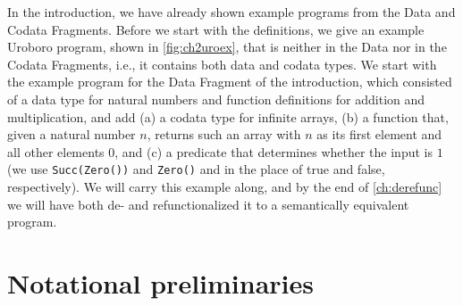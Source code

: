 In the introduction, we have already shown example programs from the Data and Codata Fragments. Before we start with the definitions, we give an example Uroboro program, shown in \autoref{fig:ch2uroex}, that is neither in the Data nor in the Codata Fragments, i.e., it contains both data and codata types. We start with the example program for the Data Fragment of the introduction, which consisted of a data type for natural numbers and function definitions for addition and multiplication, and add (a) a codata type for infinite arrays, (b) a function that, given a natural number $n$, returns such an array with $n$ as its first element and all other elements $0$, and (c) a predicate that determines whether the input is $1$ (we use \texttt{Succ(Zero())} and \texttt{Zero()} and in the place of true and false, respectively). We will carry this example along, and by the end of \autoref{ch:derefunc} we will have both de- and refunctionalized it to a semantically equivalent program.

\section{Notational preliminaries}
\label{sec:uronotp}


